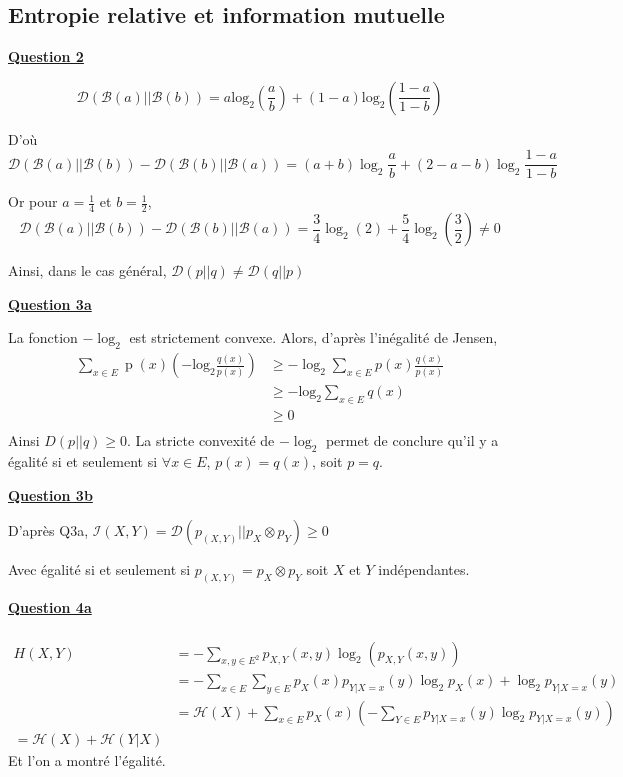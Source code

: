 \documentclass[a4paper,twoside,10pt]{article}
\renewcommand{\H}{\mathcal{H}}
\newcommand{\I}{\mathcal{I}}
\newcommand{\B}{\mathcal{B}}
\newcommand{\D}{\mathcal{D}}
\newenvironment{Q}[1]{%
\vspace{1ex}
\underline{\textbf{Question #1\\}}
\newline
}{
\vspace{2ex}
}
\begin{document}
\subsection{Entropie relative et information mutuelle}
\begin{Q}{2}
\[
\D(\B(a)||\B(b))
= a \operatorname{log_2}(\frac{a}{b}) + (1-a) \operatorname{log_2}(\frac{1-a}{1-b})
\]

D'où
\[\D(\B(a)||\B(b))  - \D(\B(b)||\B(a)) 
= (a+b)\log_2{\frac{a}{b}} + (2-a-b)\log_2{\frac{1-a}{1-b}}
\]

Or pour $a = \frac{1}{4}$ et $b = \frac{1}{2}$, 
\[
\D(\B(a)||\B(b))  - \D(\B(b)||\B(a))
= \frac{3}{4} \log_2{(2)} + \frac{5}{4} \log_2{(\frac{3}{2})} \neq 0
\]


Ainsi, dans le cas général, $ \D (p||q) \neq \D(q||p)$
\end{Q}

\begin{Q}{3a}
La fonction $- \log_2$ est strictement convexe. Alors, d'après l'inégalité de Jensen,
\begin{align*}
\sum_{x \in E} \operatorname{p}(x) \left(
	- \operatorname{log_2}\frac{q(x)}{p(x)}
	\right) &\geq 
		-\log_2{\sum_{x \in E} p(x) \frac{q(x)}{p(x)}} \\
&\geq -\operatorname{log_2} \sum_{x \in E}q(x) \\
&\geq 0 \\
\end{align*}
Ainsi $D(p||q) \geq 0$.
La stricte convexité de $-\log_2$ permet de conclure qu'il y a égalité si et seulement si $\forall x \in E$, $p(x) = q(x)$, soit $p=q$. 
\end{Q}

\begin{Q}{3b}

D'après Q3a, $\I(X,Y) = \D(p_{(X,Y)} || p_X \otimes p_Y) \geq 0$

Avec égalité si et seulement si $p_{(X,Y)} = p_X \otimes p_Y$ soit $X$ et $Y$ indépendantes.
\end{Q}

\begin{Q}{4a}
\begin{align*}
\\H(X,Y) &= - \sum_{x,y \in E^2}  p_{X,Y}(x,y)\log_2{(p_{X,Y}(x,y))} \\
	&= -\sum_{x \in E} \sum_{y \in E} p_X(x) p_{Y|X = x}(y) \log_2{p_X(x)}
		+ \log_2{p_{Y|X= x}(y)} \\
	&= \H(X) + \sum_{x \in E} p_X(x)
		\left(
			-\sum_{Y \in E} p_{Y|X = x}(y) \log_2{p_{Y|X = x}(y)}
		\right) \\
 = \H(X) + \H(Y|X)
\end{align*}
Et l'on a montré l'égalité.
\end{Q} 
 
\end{document}
